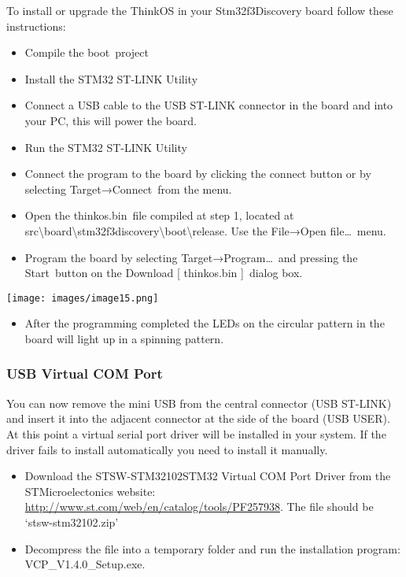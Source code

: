 {To install or upgrade the ThinkOS in your Stm32f3Discovery board follow
these instructions:}

\begin{itemize}
\tightlist
\item
  {Compile the }{boot}{~project }
\item
  {Install the STM32 ST-LINK Utility}
\item
  {Connect a USB cable to the USB ST-LINK connector in the board and
  into your PC, this will power the board.}
\item
  {Run the STM32 ST-LINK Utility}
\item
  {Connect the program to the board by clicking the connect button or by
  selecting }{Target}{→}{Connect}{~from the menu.}
\item
  {Open the }{thinkos.bin}{~file compiled at step 1, located at
  src\textbackslash{}board\textbackslash{}stm32f3discovery\textbackslash{}boot\textbackslash{}release.
  Use the }{File}{→}{Open file\ldots{}}{~menu.}
\item
  {Program the board by selecting }{Target}{→}{Program\ldots{}}{~and
  pressing the }{Start}{~button on the }{Download {[} thinkos.bin
  {]}}{~dialog box.}
\end{itemize}

{\texttt{[image: images/image15.png]}}

\begin{itemize}
\tightlist
\item
  {After the programming completed the LEDs on the circular pattern in
  the board will light up in a spinning pattern.}
\end{itemize}

\hypertarget{h.44sinio}{\subsubsection{\texorpdfstring{{USB Virtual COM
Port}}{USB Virtual COM Port}}\label{h.44sinio}}

{You can now remove the mini USB from the central connector (}{USB
ST-LINK}{) and insert it into the adjacent connector at the side of the
board (}{USB USER}{). At this point a virtual serial port driver will be
installed in your system. If the driver fails to install automatically
you need to install it manually. }

\begin{itemize}
\tightlist
\item
  {Download the STSW-STM32102STM32 Virtual COM Port Driver from the
  STMicroelectonics website:
  }{\href{https://www.google.com/url?q=http://www.st.com/web/en/catalog/tools/PF257938\&sa=D\&ust=1511275046387000\&usg=AFQjCNHybx7g4II_reWXNPTvvvAeYlCa4Q}{http://www.st.com/web/en/catalog/tools/PF257938}}{.
  The file should be `stsw-stm32102.zip'}
\item
  {Decompress the file into a temporary folder and run the installation
  program: }{VCP\_V1.4.0\_Setup.exe}{.}
\end{itemize}

